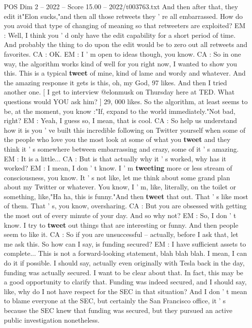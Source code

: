 \begin{textsample}{POS Dim 2 – 2022 – Score 15.00 – 2022/t003763.txt}
And then after that, they edit it"Elon sucks,"and then all those retweets they ' re all embarrassed.
How do you avoid that type of changing of meaning so that retweeters are exploited?
EM : Well, I think you ' d only have the edit capability for a short period of time.
And probably the thing to do upon the edit would be to zero out all retweets and favorites.
CA : OK.
EM : I ' m open to ideas though, you know.
CA : So in one way, the algorithm works kind of well for you right now, I wanted to show you this.
This is a typical \textbf{tweet} of mine, kind of lame and wordy and whatever.
And the amazing response it gets is this, oh, my God, 97 likes.
And then I tried another one. [ I get to interview @elonmusk on Thursday here at TED.
What questions would YOU ask him? ] 29, 000 likes.
So the algorithm, at least seems to be, at the moment, you know :"If, expand to the world immediately."Not bad, right?
EM : Yeah, I guess so, I mean, that is cool.
CA : So help us understand how it is you ' ve built this incredible following on Twitter yourself when some of the people who love you the most look at some of what you \textbf{tweet} and they think it ' s somewhere between embarrassing and crazy, some of it ' s amazing.
EM : It is a little...
CA : But is that actually why it ' s worked, why has it worked?
EM : I mean, I don ' t know.
I ' m \textbf{tweeting} more or less stream of consciousness, you know.
It ' s not like, let me think about some grand plan about my Twitter or whatever.
You know, I ' m, like, literally, on the toilet or something, like,"Ha ha, this is funny."And then \textbf{tweet} that out.
That ' s like most of them.
That ' s, you know, oversharing.
CA : But you are obsessed with getting the most out of every minute of your day.
And so why not?
EM : So, I don ' t know.
I try to \textbf{tweet} out things that are interesting or funny.
And then people seem to like it.
CA : So if you are unsuccessful -- actually, before I ask that, let me ask this.
So how can I say, is funding secured?
EM : I have sufficient assets to complete...
This is not a forward-looking statement, blah blah blah.
I mean, I can do it if possible.
I should say, actually even originally with Tesla back in the day, funding was actually secured.
I want to be clear about that.
In fact, this may be a good opportunity to clarify that.
Funding was indeed secured, and I should say, like, why do I not have respect for the SEC in that situation?
And I don ' t mean to blame everyone at the SEC, but certainly the San Francisco office, it ' s because the SEC knew that funding was secured, but they pursued an active public investigation nonetheless.

\end{textsample}
